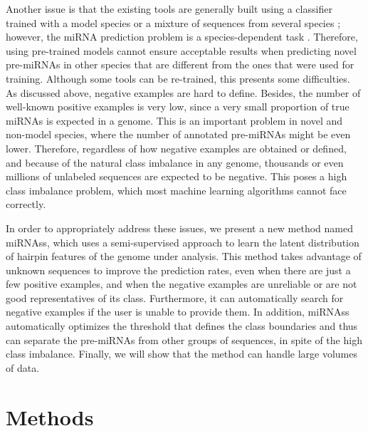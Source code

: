 \documentclass{article}
\begin{document}
Another issue is that the existing tools are generally built using a classifier trained with a model species \citep{batuwita2009micropred} or a mixture of sequences from several species \citep{gudys2013huntmi}; however, the miRNA prediction problem is a species-dependent task \citep{de2016automatic}. Therefore, using pre-trained models cannot ensure acceptable results when predicting novel pre-miRNAs in other species that are different from the ones that were used for training. Although some tools can be re-trained, this presents some difficulties. As discussed above, negative examples are hard to define. Besides, the number of well-known positive examples is very low, since a very small proportion of true miRNAs is expected in a genome. This is an important problem in novel and non-model species, where the number of annotated pre-miRNAs might be even lower. Therefore, regardless of how negative examples are obtained or defined, and because of the natural class imbalance in any genome, thousands or even millions of unlabeled sequences are expected to be negative. This poses a high class imbalance problem, which most machine learning algorithms cannot face correctly.

In order to appropriately address these issues, we present a new method named miRNAss, which uses a semi-supervised approach to learn the latent distribution of hairpin features of the genome under analysis. This method takes advantage of unknown sequences to improve the prediction rates, even when there are just a few positive examples, and when the negative examples are unreliable or are not good representatives of its class. Furthermore, it can automatically search for negative examples if the user is unable to provide them. In addition, miRNAss automatically optimizes the threshold that defines the class boundaries and thus can separate the pre-miRNAs from other groups of sequences, in spite of the high class imbalance. Finally, we will show that the method can handle large volumes of data.

\section{Methods} \label{sec:method}
\end{document}
